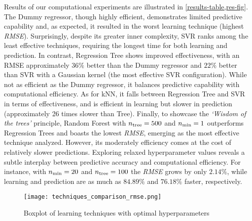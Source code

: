 \documentclass{article}
\newcommand{\nmin}{n_{\rm min}}
\newcommand{\ntree}{n_{\rm tree}}
\begin{document}
Results of our computational experiments are illustrated in \cref{results-table,res-fig}.
The Dummy regressor, though highly efficient, demonstrates limited predictive capability and, as expected, it resulted in the worst learning technique (highest \textit{RMSE}). Surprisingly, despite its greater inner complexity, SVR ranks among the least effective techniques, requiring the longest time for both learning and prediction. In contrast, Regression Tree shows improved effectiveness, with an RMSE  approximately $36\%$ better than the Dummy regressor and $22\%$ better than SVR with a Gaussian kernel (the most effective SVR configuration). While not as efficient as the Dummy regressor, it balances predictive capability with computational efficiency. As for kNN, it falls between Regression Tree and SVR in terms of effectiveness, and is efficient in learning but slower in prediction (approximately 26 times slower than Tree). Finally, to showcase the \textit{`Wisdom of the trees'} principle, Random Forest with $\ntree=500$ and $\nmin=1$ outperforms Regression Trees and boasts the lowest \textit{RMSE}, emerging as the most effective technique analyzed. However, its moderately efficiency comes at the cost of relatively slower predictions. Exploring relaxed hyperparameter values reveals a subtle interplay between predictive accuracy and computational efficiency. For instance, with $\nmin=20$ and $\ntree=100$ the \textit{RMSE} grows by only $2.14\%$, while learning and prediction are as much as $84.89\%$ and $76.18\%$ faster, respectively.
\begin{figure}[h]
    \centering
    \texttt{[image: techniques\_comparison\_rmse.png]}
    \caption{\footnotesize Boxplot of learning techniques with optimal hyperparameters}
    \label{res-fig}
\end{figure}
\newpage
\nocite{slides,james2013introduction}


\end{document}
